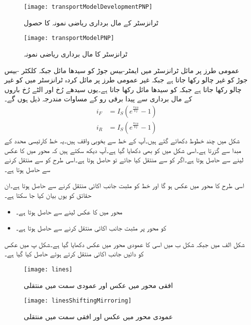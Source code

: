 \begin{figure}
\centering
\texttt{[image: transportModelDevelopmentPNP]}
\caption{ ٹرانزسٹر کے مال برداری ریاضی نمونہ کا حصول}
\label{شکل_ٹرانزسٹر_کا_مال_برداری_ماڈل_کا_حصول_مثبت_منفی_مثبت}
\end{figure}
%
\begin{figure}
\centering
\texttt{[image: transportModelPNP]}
\caption{ ٹرانزسٹر کا مال برداری ریاضی نمونہ }
\label{شکل_ٹرانزسٹر_کا_مال_برداری_ماڈل_مثبت_منفی_مثبت}
\end{figure}
عمومی طرز پر مائل ٹرانزسٹر میں ایمٹر-بیس جوڑ کو سیدھا مائل   جبکہ کلکٹر -بیس جوڑ کو غیر چالو رکھا جاتا ہے جبکہ غیر عمومی طرز پر مائل کردہ   ٹرانزسٹر میں   کو غیر چالو رکھا جاتا ہے جبکہ  کو سیدھا مائل رکھا جاتا ہے۔یوں سیدھے رُخ اور الٹے رُخ باروں کے مال برداری سے پیدا برقی رو کے مساوات مندرجہ ذیل ہوں گے۔
\begin{align}
i_F&=I_S \left (e^{\frac{v_{EB}}{V_T}}-1 \right )\\
i_R&=I_S \left(e^{\frac{v_{CB}}{V_T}}-1 \right )
\end{align}
شکل  میں چند خطوط دکھائے گئے ہیں۔آپ  کے خط سے بخوبی واقف ہیں۔یہ خط کارتیسی محدد کے مبدا  سے گزرتا ہے۔اسی شکل میں  کو بھی دکھایا گیا ہے۔آپ دیکھ سکتے ہیں کہ  محور میں  کا  عکس لینے سے  حاصل ہوتا ہے۔اگر  کو  سے  منتقل کیا جائے تو  حاصل ہوتا ہے۔اسی طرح   کو  سے  منتقل کرنے سے  حاصل ہوتا ہے۔

اسی طرح   کا  محور میں عکس  ہو گا اور خط کو مثبت  جانب  اکائی منتقل کرنے سے  حاصل ہوتا ہے۔ان حقائق کو یوں بیان کیا جا سکتا ہے۔
\begin{itemize}
\item
{} محور میں   کا عکس لینے سے  حاصل ہوتا ہے۔
\item
{} کو  محور پر مثبت جانب  اکائی  منتقل کرنے سے  حاصل ہوتا ہے۔
\end{itemize} 
شکل  الف  میں  جبکہ شکل ب میں اسی کا عمودی محور میں عکس  دکھایا گیا ہے۔شکل پ میں عکس کو دائیں جانب  اکائی منتقل کرتے ہوئے  حاصل کیا گیا ہے۔
%
\begin{figure}
\centering
\texttt{[image: lines]}
\caption{افقی محور میں عکس اور عمودی سمت میں منتقلی}
\label{شکل_ٹرانزسٹر_افقی_عکس_عمودی_منتقلی}
\end{figure}
%
\begin{figure}
\centering
\texttt{[image: linesShiftingMirroring]}
\caption{عمودی محور میں عکس اور افقی سمت میں منتقلی}
\label{شکل_ٹرانزسٹر_عمودی_عکس_افقی_منتقلی}
\end{figure}
%

